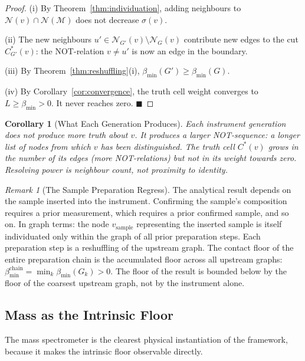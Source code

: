 \documentclass[11pt,twocolumn,a4paper]{article}
\theoremstyle{plain}
\newtheorem{corollary}[theorem]{Corollary}
\theoremstyle{definition}
\theoremstyle{remark}
\newtheorem{remark}[theorem]{Remark}
\newcommand{\med}{\mathcal{M}}
\newcommand{\Nbd}{\mathcal{N}}
\newcommand{\bmin}{\beta_{\min}}
\renewcommand{\qed}{\hfill$\blacksquare$}
\begin{document}
\begin{proof}
(i) By Theorem~\ref{thm:individuation}, adding neighbours to $\Nbd(v) \cap
\Nbd(\med)$ does not decrease $\sigma(v)$.

(ii) The new neighbours $u' \in \Nbd_{G'}(v) \setminus \Nbd_G(v)$ contribute
new edges to the cut $C^*_{G'}(v)$: the NOT-relation $v \neq u'$ is now an
edge in the boundary.

(iii) By Theorem~\ref{thm:reshuffling}(i), $\bmin(G') \geq \bmin(G)$.

(iv) By Corollary~\ref{cor:convergence}, the truth cell weight converges to
$L \geq \bmin > 0$. It never reaches zero. \qed
\end{proof}

\begin{corollary}[What Each Generation Produces]
\label{cor:generation}
Each instrument generation does not produce more truth about $v$. It produces
a larger NOT-sequence: a longer list of nodes from which $v$ has been
distinguished. The truth cell $C^*(v)$ grows in the number of its edges
(more NOT-relations) but not in its weight towards zero. Resolving power is
neighbour count, not proximity to identity.
\end{corollary}

\begin{remark}[The Sample Preparation Regress]
\label{rem:regress}
The analytical result depends on the sample inserted into the instrument.
Confirming the sample's composition requires a prior measurement, which
requires a prior confirmed sample, and so on. In graph terms: the node
$v_{\mathrm{sample}}$ representing the inserted sample is itself individuated
only within the graph of all prior preparation steps. Each preparation step
is a reshuffling of the upstream graph. The contact floor of the entire
preparation chain is the accumulated floor across all upstream graphs:
$\bmin^{\mathrm{chain}} = \min_k \bmin(G_k) > 0$. The floor of the
result is bounded below by the floor of the coarsest upstream graph,
not by the instrument alone.
\end{remark}

\subsection{Mass as the Intrinsic Floor}

The mass spectrometer is the clearest physical instantiation of the framework,
because it makes the intrinsic floor observable directly.
\end{document}

